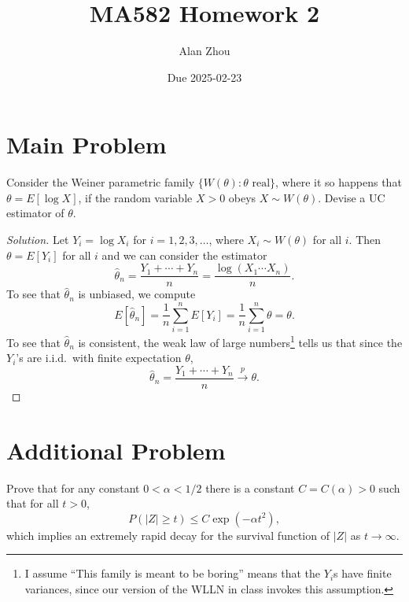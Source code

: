 \documentclass{article}
\title{MA582 Homework 2}
\author{Alan Zhou}
\date{Due 2025-02-23}
\begin{document}
\maketitle


\section{Main Problem}

Consider the Weiner parametric family $\{W(\theta):\theta\text{ real}\}$, where it so happens that $\theta = E[\log X]$, if the random variable $X > 0$ obeys $X\sim W(\theta)$. Devise a UC estimator of $\theta$.

\begin{proof}[Solution]
Let $Y_i = \log X_i$ for $i = 1, 2, 3, \ldots$, where $X_i\sim W(\theta)$ for all $i$. Then $\theta = E[Y_i]$ for all $i$ and we can consider the estimator
\begin{equation*}
\hat{\theta}_n = \frac{Y_1 + \cdots + Y_n}{n} = \frac{\log(X_1\cdots X_n)}{n}.
\end{equation*}
To see that $\hat{\theta}_n$ is unbiased, we compute
\begin{equation*}
E[\hat{\theta}_n] = \frac{1}{n}\sum_{i = 1}^n E[Y_i] = \frac{1}{n}\sum_{i = 1}^n\theta = \theta.
\end{equation*}
To see that $\hat{\theta}_n$ is consistent, the weak law of large numbers\footnote{I assume ``This family is meant to be boring'' means that the $Y_i$s have finite variances, since our version of the WLLN in class invokes this assumption.} tells us that since the $Y_i$'s are i.i.d.~with finite expectation $\theta$,
\begin{equation*}
\hat{\theta}_n = \frac{Y_1 + \cdots + Y_n}{n}\stackrel{p}{\longrightarrow} \theta.
\end{equation*}
\end{proof}

\newpage
\section{Additional Problem}

Prove that for any constant $0 < \alpha < 1/2$ there is a constant $C = C(\alpha) > 0$ such that for all $t > 0$,
\begin{equation*}
P(\lvert Z\rvert\geq t)\leq C\exp(-\alpha t^2),
\end{equation*}
which implies an extremely rapid decay for the survival function of $\lvert Z\rvert$ as $t\to\infty$.
\end{document}
